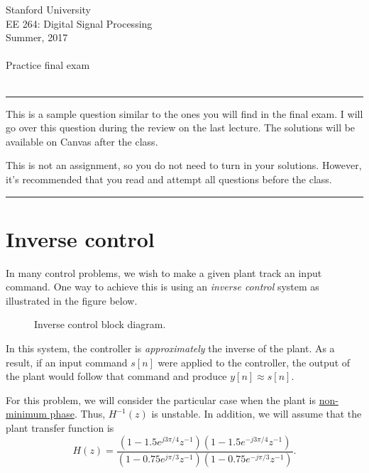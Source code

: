 \documentclass[12pt]{report}
\begin{document}
\thispagestyle{empty}
\begin{centering}
	{\large Stanford University}\\
	{\large EE 264: Digital Signal Processing}\\
	{\large Summer, 2017} \\
	\mbox{}\\
	{\large Practice final exam}\\
	\mbox{}\\
\end{centering}
\noindent \rule{6.5 in}{0.5pt}
This is a sample question similar to the ones you will find in the final exam. I will go over this question during the review on the last lecture. The solutions will be available on Canvas after the class.

\noindent This is not an assignment, so you do not need to turn in your solutions. However, it's recommended that you read and attempt all questions before the class.

\noindent
\rule{6.5 in}{0.5pt}

\section*{Inverse control} 

In many control problems, we wish to make a given plant track an input command. One way to achieve this is using an \textit{inverse control} system as illustrated in the figure below.

\FloatBarrier
\begin{figure}[h!]
	\centering
	\resizebox{0.7\textwidth}{!}{}
	\caption{Inverse control block diagram.}
\end{figure}
\FloatBarrier

In this system, the controller is \textit{approximately} the inverse of the plant. As a result, if an input command $s[n]$ were applied to the controller, the output of the plant would follow that command and produce $y[n] \approx s[n]$. 

For this problem, we will consider the particular case when the plant is \underline{non-minimum phase}. Thus, $H^{-1}(z)$ is unstable. In addition, we will assume that the plant transfer function is
\begin{equation}
	H(z) = \frac{(1 - 1.5e^{j3\pi/4}z^{-1})(1 - 1.5e^{-j3\pi/4}z^{-1})}{(1 - 0.75e^{j\pi/3}z^{-1})(1 - 0.75e^{-j\pi/3}z^{-1})}.
\end{equation}
\end{document}
